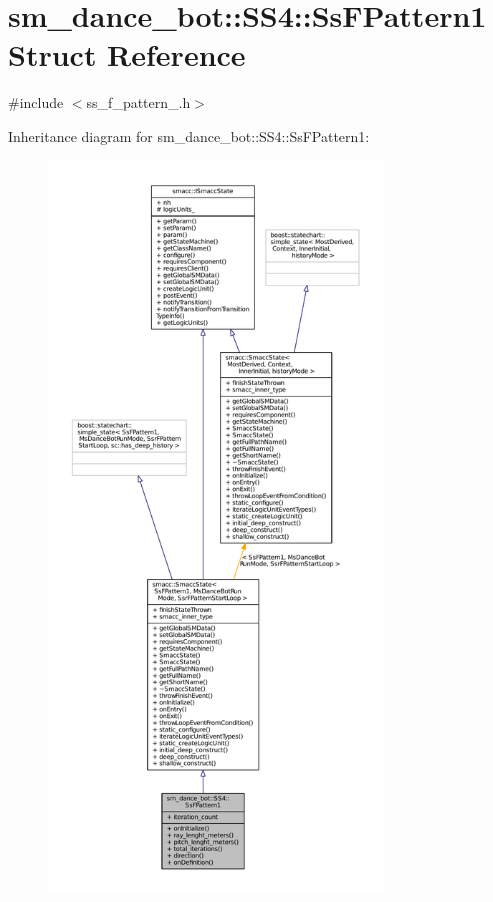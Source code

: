 \hypertarget{structsm__dance__bot_1_1SS4_1_1SsFPattern1}{}\section{sm\+\_\+dance\+\_\+bot\+:\+:S\+S4\+:\+:Ss\+F\+Pattern1 Struct Reference}
\label{structsm__dance__bot_1_1SS4_1_1SsFPattern1}


{\ttfamily \#include $<$ss\+\_\+f\+\_\+pattern\+\_.\+h$>$}



Inheritance diagram for sm\+\_\+dance\+\_\+bot\+:\+:S\+S4\+:\+:Ss\+F\+Pattern1\+:
\nopagebreak
\begin{figure}[H]
\begin{center}
\leavevmode
\includegraphics[height=550pt]{structsm__dance__bot_1_1SS4_1_1SsFPattern1__inherit__graph}
\end{center}
\end{figure}



